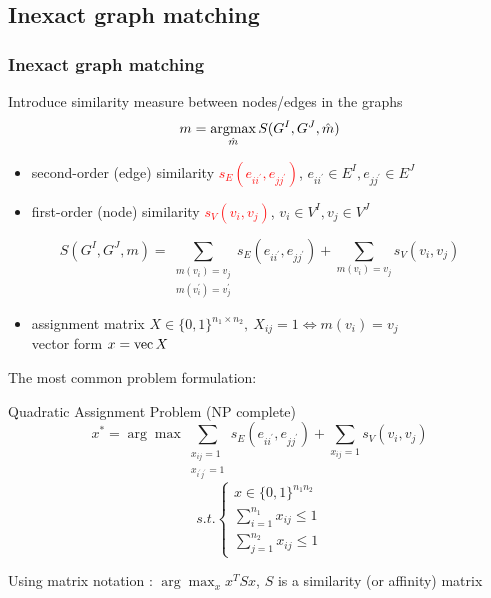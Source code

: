 \documentclass[handout]{beamer}
\def\vec{\mathop{\rm vec}}								%
\def\argmax{\mathop{\rm argmax}}						%
\begin{document}
\subsection{Inexact graph matching}
\begin{frame} [allowframebreaks]
\frametitle{Inexact graph matching}
Introduce similarity measure between nodes/edges in the graphs
\begin{equation*}
m = \argmax_{\hat{m}}S(G^I, G^J, \hat{m})
\end{equation*}
\begin{itemize}
\item second-order (edge) similarity \textcolor{red}{$s_E(e_{ii^\prime},e_{jj^\prime})$}, $e_{ii^\prime}\in E^I, e_{jj^\prime}\in E^J$
\item first-order (node) similarity \textcolor{red}{$s_V(v_{i},v_{j})$}, $v_i\in V^I, v_j\in V^J$
\end{itemize}

\begin{equation*}
	S(G^I,G^J,m)=\sum_{\substack{m(v_i)=v_j\\m(v_i^{\prime})=v_j^{\prime}}}s_E(e_{ii^\prime},e_{jj^\prime}) + \sum_{m(v_i)=v_j}s_V(v_{i},v_{j})
\end{equation*}

\begin{itemize}
\item assignment matrix $X\in\{0,1\}^{n_1\times n_2},\ X_{ij}=1\iff m(v_i)=v_j$ \\
      vector form $x = \vec{X}$
\end{itemize}

\framebreak
The most common problem formulation:
\begin{block}{Quadratic Assignment Problem (NP complete)~{\tiny\citep{Burkard98thequadratic}}}
$$x^* = \arg\max \sum_{\substack{x_{ij}=1\\x_{i^\prime j^\prime}=1}}s_E(e_{ii^\prime},e_{jj^\prime}) + \sum_{x_{ij}=1}s_V(v_{i},v_{j}) $$
$$ s.t. \begin{cases}
		x\in\{0,1\}^{n_1n_2} \\
		\sum_{i=1}^{n_1}x_{ij}\le 1 \\
		\sum_{j=1}^{n_2}x_{ij}\le 1
\end{cases}$$
\end{block}
Using matrix notation : $\arg\max_{x}{x^TSx}$, $S$ is a similarity (or affinity) matrix



\end{frame}
\end{document}
